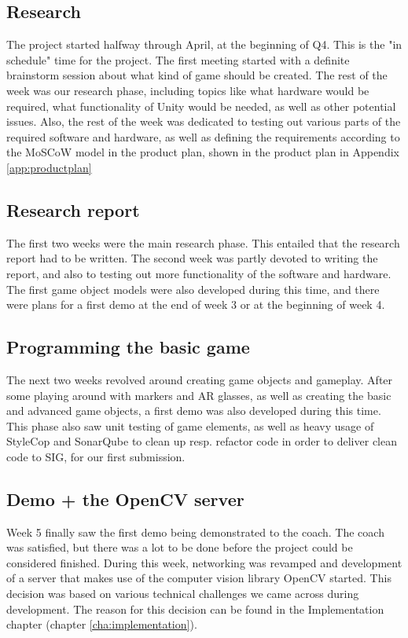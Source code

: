       \subsection{Research} \label{ssec:research}
      The project started halfway through April, at the beginning of Q4.
      This is the "in schedule" time for the project. The first meeting
      started with a definite brainstorm session about what kind of game
      should be created. The rest of the week was our research phase, including
      topics like what hardware would be required, what functionality of Unity 
      would be needed, as well as other potential issues. Also, the rest of the 
      week was dedicated to testing out various parts of the required software 
      and hardware, as well as defining the requirements according to the MoSCoW 
      model in the product plan, shown in the product plan in Appendix \ref{app:productplan}
      
      \subsection{Research report} \label{ssec:researchreport}
      The first two weeks were the main research phase. This entailed that the
      research report had to be written. The second week was partly devoted
      to writing the report, and also to testing out more functionality of
      the software and hardware. The first game object models were also
      developed during this time, and there were plans for a first demo at the end
      of week 3 or at the beginning of week 4.
      
      \subsection{Programming the basic game} \label{ssec:basics}
      The next two weeks revolved around creating game objects and gameplay.
      After some playing around with markers and AR glasses, as well as
      creating the basic and advanced game objects, a first demo was also
      developed during this time. This phase also saw unit testing of game
      elements, as well as heavy usage of StyleCop and SonarQube to clean up
      resp. refactor code in order to deliver clean code to SIG, for our first
      submission.
      
      \subsection{Demo + the OpenCV server} \label{ssec:firstdemo}
      Week 5 finally saw the first demo being demonstrated to the coach. The
      coach was satisfied, but there was a lot to be done before the project
      could be considered finished. During this week, networking was revamped
      and development of a server that makes use of the computer vision library
      OpenCV started. This decision was based on various technical challenges we 
      came across during development. The reason for this decision can be found 
      in the Implementation chapter (chapter \ref{cha:implementation}).
      
